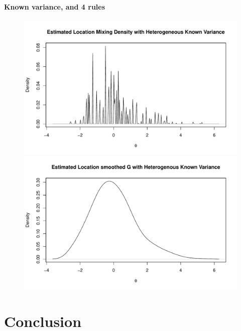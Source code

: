 \documentclass[12pt]{article}
\begin{document}
\paragraph{Known variance, and 4 rules}
\begin{figure}[h]
    \centering
    \begin{minipage}{0.5\textwidth}
        \centering
        \includegraphics[width=\textwidth]{../../Figures/2013-2022/GMM_m/GLmix.pdf}
    \end{minipage}\hfill
    \begin{minipage}{0.5\textwidth}
        \centering
        \includegraphics[width=\textwidth]{../../Figures/2013-2022/GMM_m/GLmix_s.pdf}
    \end{minipage}
\end{figure}

\section{Conclusion}
\end{document}
